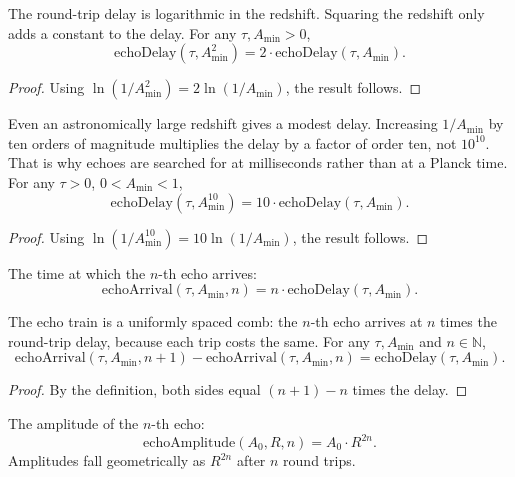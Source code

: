 \begin{theorem}
The round-trip delay is logarithmic in the redshift. Squaring the redshift only adds a constant to the delay. For any $\tau, A_{\min} > 0$,
\[
\text{echoDelay}(\tau, A_{\min}^2) = 2 \cdot \text{echoDelay}(\tau, A_{\min}).
\]
\begin{proof}
Using $\ln(1/A_{\min}^2) = 2\ln(1/A_{\min})$, the result follows.
\end{proof}
\end{theorem}

\begin{theorem}
Even an astronomically large redshift gives a modest delay. Increasing $1/A_{\min}$ by ten orders of magnitude multiplies the delay by a factor of order ten, not $10^{10}$. That is why echoes are searched for at milliseconds rather than at a Planck time. For any $\tau > 0$, $0 < A_{\min} < 1$,
\[
\text{echoDelay}(\tau, A_{\min}^{10}) = 10 \cdot \text{echoDelay}(\tau, A_{\min}).
\]
\begin{proof}
Using $\ln(1/A_{\min}^{10}) = 10\ln(1/A_{\min})$, the result follows.
\end{proof}
\end{theorem}

\begin{definition}
The time at which the $n$-th echo arrives:
\[
\text{echoArrival}(\tau, A_{\min}, n) = n \cdot \text{echoDelay}(\tau, A_{\min}).
\]
\end{definition}

\begin{theorem}
The echo train is a uniformly spaced comb: the $n$-th echo arrives at $n$ times the round-trip delay, because each trip costs the same. For any $\tau, A_{\min}$ and $n \in \mathbb{N}$,
\[
\text{echoArrival}(\tau, A_{\min}, n+1) - \text{echoArrival}(\tau, A_{\min}, n) = \text{echoDelay}(\tau, A_{\min}).
\]
\begin{proof}
By the definition, both sides equal $(n+1) - n$ times the delay.
\end{proof}
\end{theorem}

\begin{definition}
The amplitude of the $n$-th echo:
\[
\text{echoAmplitude}(A_0, R, n) = A_0 \cdot R^{2n}.
\]
Amplitudes fall geometrically as $R^{2n}$ after $n$ round trips.
\end{definition}

